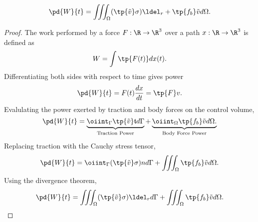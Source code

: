 \begin{thm}
    \begin{equation}
        \pd{W}{t} = \iiint_\Omega (\tp{\tilde{v}} \sigma) \ldel_r + \tp{f_b} \tilde{v} d\Omega.
    \end{equation}
\end{thm}
\begin{proof}
    The work performed by a force $F:\R\to \R^3$ over a path $x:\R\to \R^3$
    is defined as
    \begin{equation}
        W = \int \tp{F(t)} dx(t).
    \end{equation}
    Differentiating both sides with respect to time gives power
    \begin{equation}
        \pd{W}{t} = F(t) \frac{dx}{dt} = \tp{F} v.
    \end{equation}
    Evalulating the power exerted by traction and body forces on the control volume,
    \begin{equation}
        \pd{W}{t} =
        \underbrace{\oiint_\Gamma \tp{\tilde{v}} \mathfrak{t} d\Gamma}_{\text{Traction Power}} +
        \underbrace{\oiint_\Omega \tp{f_b}\tilde{v} d\Omega.}_{\text{Body Force Power}}
    \end{equation}
    Replacing traction with the Cauchy stress tensor,
    \begin{equation}
        \pd{W}{t} = \oiint_\Gamma (\tp{\tilde{v}} \sigma) n d\Gamma + \iiint_\Omega \tp{f_b} \tilde{v} d\Omega.
    \end{equation}
    Using the divergence theorem,
    \begin{equation}
        \pd{W}{t} = \iiint_\Omega (\tp{\tilde{v}} \sigma) \ldel_r d\Gamma + \iiint_\Omega \tp{f_b} \tilde{v} d\Omega.
    \end{equation}
\end{proof}

